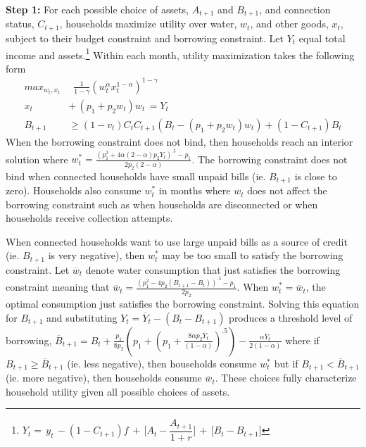 \documentclass[12pt]{article}
\begin{document}
\textbf{Step 1:} For each possible choice of assets, $A_{t+1}$ and $B_{t+1}$, and connection status, $C_{t+1}$, households maximize utility over water, $w_t$, and other goods, $x_t$, subject to their budget constraint and borrowing constraint.  Let $Y_t$ equal total income and assets.\footnote{$Y_t=\, y_t \, - (1-C_{t+1})f  \, + \, \Big[  A_t  - \dfrac{A_{t+1}}{1+r}  \Big] \, + \, \Big[ B_t - B_{t+1} \Big]$}  Within each month, utility maximization takes the following form
\begin{align*}
max_{w_t,x_t}& \,\,\, \frac{1}{1-\gamma}(w_{t}^{\alpha}x_{t}^{1-\alpha})^{1-\gamma}  \\
x_t \, &+ \, (p_1+p_2w_t)w_t \, = Y_t   \\
B_{t+1} &\geq (1-v_t)  C_{t} C_{t+1} (B_t -(p_1+p_2w_t)w_t) + (1-C_{t+1})B_t 
\end{align*}
When the borrowing constraint does not bind, then households reach an interior solution where $w_t^{*} =  \frac{(p_1^2 + 4 \alpha(2 - \alpha) p_2 Y_t)^{.5} - p_1}{2 p_2 (2-\alpha)}$.  The borrowing constraint does not bind when connected households have small unpaid bills (ie. $B_{t+1}$ is close to zero).  Households also consume $w_t^{*}$ in months where $w_t$ does not affect the borrowing constraint such as when households are disconnected or when households receive collection attempts.



When connected households want to use large unpaid bills as a source of credit (ie. $B_{t+1}$ is very negative), then $w_t^{*}$ may be too small to satisfy the borrowing constraint.  Let $\overline{w}_t$ denote water consumption that just satisfies the borrowing constraint meaning that $\overline{w}_t = \frac{(p_1^2 - 4p_2 (B_{t+1}-B_{t}))^{.5} - p_1}{2 p_2}$.  When $w^{*}_t=\overline{w}_t$, the optimal consumption just satisfies the borrowing constraint.  Solving this equation for $B_{t+1}$ and substituting $Y_t =  \overline{Y}_t-(B_t-B_{t+1})$ produces a threshold level of borrowing, $\overline{B}_{t+1}= B_t + \frac{p_1}{8p_2} ( p_1 + (p_1 + \frac{8 \alpha p_2 \overline{Y}_t}{(1-\alpha)})^{.5}) -\frac{\alpha \overline{Y}_t}{2(1-\alpha)}$ where if $B_{t+1} \geq \overline{B}_{t+1}$ (ie. less negative), then households consume $w_t^{*}$ but if $B_{t+1} < \overline{B}_{t+1}$ (ie. more negative), then households consume $\overline{w}_t$.  These choices fully characterize household utility given all possible choices of assets.
\end{document}
